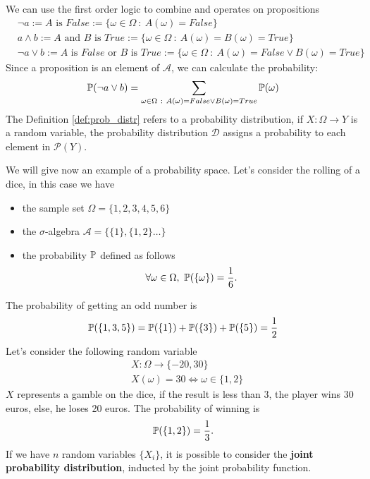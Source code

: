 \documentclass[10pt, letterpaper]{report}
\begin{document}
We can use the first order logic to combine and operates on propositions\begin{align}
	 & \lnot a := A \text{ is } False := \{\omega\in\Omega \ : \ A(\omega)=False\}                                                      \\
	 & a\land b := A \text{ and } B \text{ is } True :=\{\omega\in\Omega \ : \ A(\omega)=B(\omega)=True\}                               \\
	 & \lnot a\lor b := A \text{ is }False\text{ or } B \text{ is } True :=\{\omega\in\Omega \ : \ A(\omega)=False\lor B(\omega)=True\}
\end{align}
Since a proposition is an element of $\mathcal A$, we can calculate the probability:\begin{equation}
	\Prob(\lnot a\lor b)=\sum_{\omega\in\Omega \ : \ A(\omega)=False\lor B(\omega)=True}\Prob(\omega)
\end{equation}
The Definition \ref{def:prob_distr} refers to a probability distribution, if $X:\Omega\rightarrow Y$ is a random variable, the probability distribution $\mathcal D$ assigns a probability to each element in $\mathcal P(Y)$.\bigskip

We will give now an example of a probability space. Let's consider the rolling of a dice, in this case we have\begin{itemize}
	\item the sample set $\Omega=\{1,2,3,4,5,6\}$
	\item the $\sigma$-algebra $\mathcal A = \{\{1\},\{1,2\}\dots\}$
	\item the probability ${\mathbb P}$ defined as follows\begin{equation}
		      \forall\omega\in \Omega, \ \Prob(\{\omega\})=\frac{1}{6}.
	      \end{equation}
\end{itemize}
The probability of getting an odd number is\begin{equation}
	{\mathbb P}(\{1,3,5\})={\mathbb P}(\{1\})+{\mathbb P}(\{3\})+{\mathbb P}(\{5\})=\frac{1}{2}
\end{equation}
Let's consider the following random variable\begin{align}
	 & X:\Omega\rightarrow\{-20,30\}    \\
	 & X(\omega)=30\iff\omega\in\{1,2\}
\end{align}
$X$ represents a gamble on the dice, if the result is less than 3, the player wins 30 euros, else, he loses 20 euros. The probability of winning is\begin{equation}
	{\mathbb P}(\{1,2\})=\frac{1}{3}.
\end{equation}
If we have $n$ random variables $\{X_i\}$, it is possible to consider the \textbf{joint probability distribution}, inducted by the joint probability function.
\end{document}
